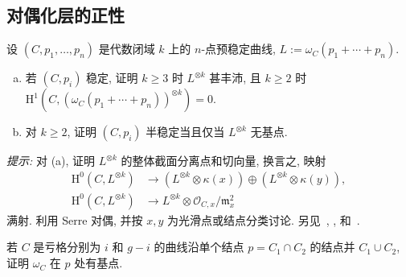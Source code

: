 \subsection{对偶化层的正性}\label{src:6.3.3-subsection}
\begin{exercise}[中等]\label{src:6.3.18}
设 $(C,\allowbreak p_1,\allowbreak \ldots,\allowbreak p_n)$ 是代数闭域 $k$ 上的 $n$-点预稳定曲线, $L:=\omega_C(p_1+\cdots+p_n)$.
\begin{enumerate}[(a)]
\item 若 $(C,\allowbreak p_i)$ 稳定, 证明 $k\geq3$ 时 $L^{\otimes k}$ 甚丰沛, 且 $k\geq2$ 时 $\mathrm H^1(C,\allowbreak (\omega_C(p_1+\cdots+p_n))^{\otimes k})=0$.
\item 对 $k\geq2$, 证明 $(C,\allowbreak p_i)$ 半稳定当且仅当 $L^{\otimes k}$ 无基点.
\end{enumerate}
\textit{提示:} 对 (a), 证明 $L^{\otimes k}$ 的整体截面分离点和切向量, 换言之, 映射
\[
\begin{aligned}
\mathrm H^0(C,L^{\otimes k})&\to(L^{\otimes k}\otimes\kappa(x))\oplus(L^{\otimes k}\otimes\kappa(y)),\\
\mathrm H^0(C,L^{\otimes k})&\to L^{\otimes k}\otimes\mathcal O_{C,x}/\mathfrak m_x^2
\end{aligned}
\]
满射. 利用 Serre 对偶, 并按 $x,\allowbreak y$ 为光滑点或结点分类讨论. 另见~\cite[定理 2]{DM69}, \cite[引理 10.6.1]{ACG11}, \cite[Tag 0E8X]{SP} 和~\cite[命题 13.2.17]{Ols16}.
\end{exercise}
\begin{exercise}[很好的练习]\label{src:6.3.19}
若 $C$ 是亏格分别为 $i$ 和 $g-i$ 的曲线沿单个结点 $p=C_1\cap C_2$ 的结点并 $C_1\cup C_2$, 证明 $\omega_C$ 在 $p$ 处有基点.
\end{exercise}
